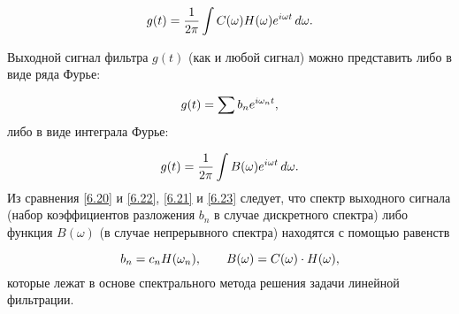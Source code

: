 \begin{enumerate}
\begin{equation}
	\eqmark{6.21}
	g(t)=\frac{1}{2\pi}\int C(\omega)H(\omega)e^{i\omega t}\,d\omega.
\end{equation}

Выходной сигнал фильтра $g(t)$ (как и любой сигнал) можно представить либо в виде ряда Фурье:

\begin{equation}
	\eqmark{6.22}
	g(t)=\sum b_n e^{i\omega_n t},
\end{equation}
либо в виде интеграла Фурье:

\begin{equation}
	\eqmark{6.23}
	g(t)=\frac{1}{2\pi}\int B(\omega)e^{i\omega t}\,d\omega.
\end{equation}
Из сравнения \eqref{6.20} и \eqref{6.22}, \eqref{6.21} и \eqref{6.23} следует, что спектр выходного сигнала (набор коэффициентов
разложения $b_n$ в случае дискретного спектра) либо функция $B(\omega)$ (в случае непрерывного спектра) находятся с
помощью равенств

\begin{equation}
	\eqmark{6.24}
	b_n=c_n H(\omega_n),\qquad B(\omega)=C(\omega)\cdot H(\omega),
\end{equation}
которые лежат в основе спектрального метода решения задачи линейной фильтрации.
\end{enumerate}



